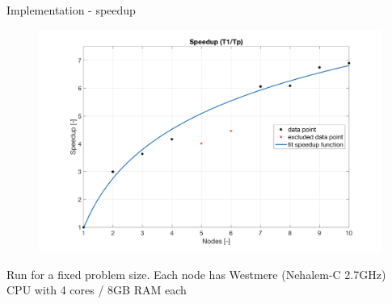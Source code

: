 \documentclass[c]{beamer}
\begin{document}

\begin{frame}{Implementation - speedup}

\begin{figure}
      \centering
      \includegraphics[width=1\textwidth]{img/speedup2.png}
    \end{figure}
    
    {\tiny * Run for a fixed problem size. Each node has Westmere (Nehalem-C 2.7GHz) CPU with 4 cores / 8GB RAM each}

\end{frame}

\end{document}
